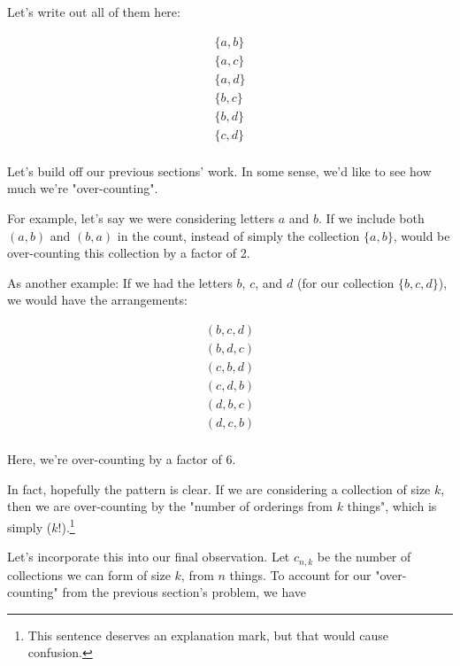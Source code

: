 Let's write out all of them here:

\begin{gather*}
\{a, b\} \\
\{a, c\} \\
\{a, d\} \\
\{b, c\} \\
\{b, d\} \\
\{c, d\} \\
\end{gather*}


Let's build off our previous sections' work. In some sense, we'd like to see how much we're "over-counting". 

For example, let's say we were considering letters $a$ and $b$. If we include both $(a, b)$ and $(b, a)$ in the count, instead of simply the collection $\{a, b\}$, would be over-counting this collection by a factor of 2. 

As another example: If we had the letters $b$, $c$, and $d$ (for our collection $\{b, c, d\}$), we would have the arrangements:

\begin{gather*}
(b, c, d) \\
(b, d, c) \\
(c, b, d) \\
(c, d, b) \\
(d, b, c) \\
(d, c, b) \\
\end{gather*}

Here, we're over-counting by a factor of 6.


In fact, hopefully the pattern is clear. If we are considering a collection of size $k$, then we are over-counting by the "number of orderings from $k$ things", which is simply ($k!$).\footnote{This sentence deserves an explanation mark, but that would cause confusion.} 

Let's incorporate this into our final observation. Let $c_{n,k}$ be the number of collections we can form of size $k$, from $n$ things. To account for our "over-counting" from the previous section's problem, we have

